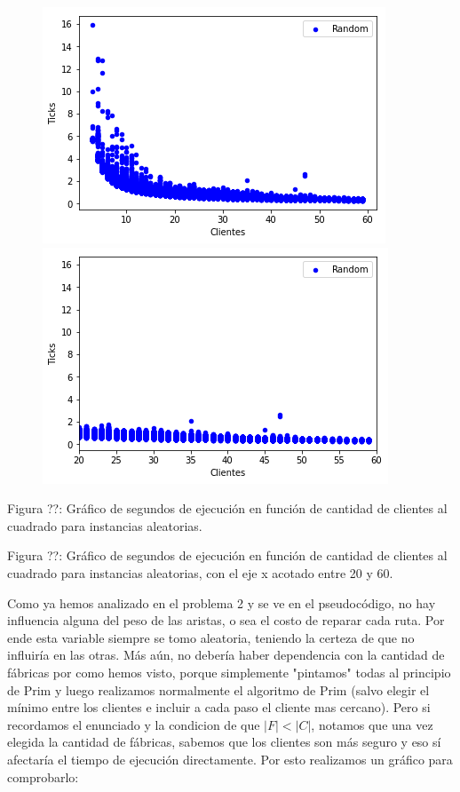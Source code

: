 \documentclass[A4paper,oneside,fleqn,11pt]{article}
\theoremstyle{definition}
\begin{document}
\begin{figure}[h!]
  \includegraphics[scale=0.6]{wasdcomplejidad1.png}
  \includegraphics[scale=0.6]{zoom1p3.png}
  
\end{figure}
\scriptsize{ Figura ??: Gráfico de segundos de ejecución en función de cantidad de clientes al cuadrado para instancias aleatorias.}

\scriptsize{ Figura ??: Gráfico de segundos de ejecución en función de cantidad de clientes al cuadrado para instancias aleatorias, con el eje x acotado entre 20 y 60.}

\normalsize

Como ya hemos analizado en el problema 2 y se ve en el pseudocódigo, no hay influencia alguna del peso de las aristas, o sea el costo de reparar cada ruta. Por ende esta variable siempre se tomo aleatoria, teniendo la certeza de que no influiría en las otras. Más aún, no debería haber dependencia con la cantidad de fábricas por como hemos visto, porque simplemente "pintamos" todas al principio de Prim y luego realizamos normalmente el algoritmo de Prim (salvo elegir el mínimo entre los clientes e incluir a cada paso el cliente mas cercano). Pero si recordamos el enunciado y la condicion de que  $|F|<|C|$, notamos que una vez elegida la cantidad de fábricas, sabemos que los clientes son más seguro y eso sí afectaría el tiempo de ejecución directamente. Por esto realizamos un gráfico para comprobarlo:
\end{document}
